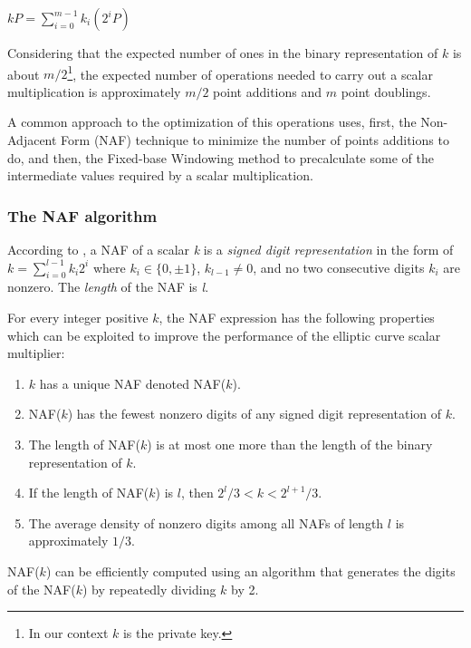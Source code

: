 \documentclass[authoryear]{elsarticle}
\begin{document}
\begin{center}
$kP = \sum_{i=0}^{m-1} k_i(2^iP)$
\end{center}

Considering that the expected number of ones in the binary representation of $k$ is about $m/2$\footnote{In our context $k$ is the private key.}, the expected number of operations needed to carry out a scalar multiplication is approximately $m/2$ point additions and $m$ point doublings.

A common approach to the optimization of this operations uses, first, the Non-Adjacent Form \citep{Menezes} (NAF) technique to minimize the number of points additions to do, and then, the Fixed-base Windowing method \citep{BrownHLM01} to precalculate some of the intermediate values required by a scalar multiplication.

\subsubsection{The NAF algorithm}
According to \citet{Menezes}, a NAF of a scalar \emph{k} is a \emph{signed digit representation} in the form of $k = \sum_{i=0}^{l-1} k_i2^i$ where $k_i \in \{0,\pm1\}$, $k_{l-1} \neq 0$, and no two consecutive digits $k_i$ are nonzero. The \emph{length} of the NAF is \emph{l}.

For every integer positive $k$, the NAF expression has the following properties which can be exploited to improve the performance of the elliptic curve scalar multiplier:

\begin{enumerate}
  \item $k$ has a unique NAF denoted NAF($k$).
  \item NAF($k$) has the fewest nonzero digits of any signed digit representation of $k$.
  \item The length of NAF($k$) is at most one more than the length of the binary representation of $k$.
  \item If the length of NAF($k$) is $l$, then $2^l/3 < k < 2^{l+1}/3$.
  \item The average density of nonzero digits among all NAFs of length $l$ is approximately $1/3$.
\end{enumerate}

NAF($k$) can be efficiently computed using an algorithm that generates the digits of the NAF($k$) by repeatedly dividing $k$ by 2.

\end{document}
